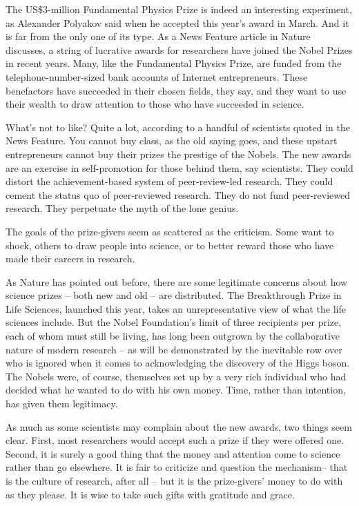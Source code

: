 The US\$3-million Fundamental Physics Prize is indeed an interesting experiment, as Alexander Polyakov said when he accepted this year's award in March. And it is far from the only one of its type. As a News Feature article in Nature discusses, a string of lucrative awards for researchers have joined the Nobel Prizes in recent years. Many, like the Fundamental Physics Prize, are funded from the telephone-number-sized bank accounts of Internet entrepreneurs. These benefactors have succeeded in their chosen fields, they say, and they want to use their wealth to draw attention to those who have succeeded in science.


What's not to like? Quite a lot, according to a handful of scientists quoted in the News Feature. You cannot buy class, as the old saying goes, and these upstart entrepreneurs cannot buy their prizes the prestige of the Nobels. The new awards  are an exercise in self-promotion for those behind them, say scientists. They could distort the achievement-based system of peer-review-led research. They could cement the status quo of peer-reviewed research. They do not fund peer-reviewed research. They perpetuate the myth of the lone genius.


The goals of the prize-givers seem as scattered as the criticism. Some want to shock, others to draw people into science, or to better reward those who have made their careers in research.


As Nature has pointed out before, there are some legitimate concerns about how science prizes – both new and old – are distributed. The Breakthrough Prize in Life Sciences, launched this year, takes an unrepresentative view of what the life sciences include. But the Nobel Foundation's limit of three recipients per prize, each of whom must still be living, has long been outgrown by the collaborative nature of modern research – as will be demonstrated by the inevitable row over who is ignored when it comes to acknowledging the discovery of the Higgs boson. The Nobels were, of course, themselves set up by a very rich individual who had decided what he wanted to do with his own money. Time, rather than intention, has given them legitimacy.


As much as some scientists may complain about the new awards, two things seem clear. First, most researchers would accept such a prize if they were offered one. Second, it is surely a good thing that the money and attention come to science rather than go elsewhere. It is fair to criticize and question the mechanism– that is the culture of research, after all – but it is the prize-givers' money to do with as they please. It is wise to take such gifts with gratitude and grace.